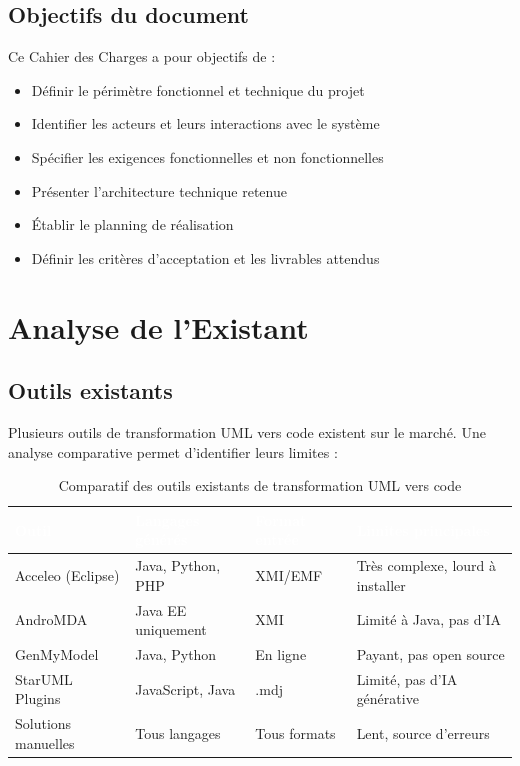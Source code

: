 \documentclass[12pt,a4paper]{article}
\begin{document}
\subsection{Objectifs du document}

Ce Cahier des Charges a pour objectifs de :
\begin{itemize}[leftmargin=1.5em]
  \item Définir le périmètre fonctionnel et technique du projet
  \item Identifier les acteurs et leurs interactions avec le système
  \item Spécifier les exigences fonctionnelles et non fonctionnelles
  \item Présenter l'architecture technique retenue
  \item Établir le planning de réalisation
  \item Définir les critères d'acceptation et les livrables attendus
\end{itemize}

\section{Analyse de l'Existant}

\subsection{Outils existants}

Plusieurs outils de transformation UML vers code existent sur le marché. Une analyse comparative permet d'identifier leurs limites :

\begin{table}[H]
\centering
\renewcommand{\arraystretch}{1.3}
\begin{tabularx}{\textwidth}{|l|l|l|X|}
\hline
\rowcolor{darkblue!90}
\textcolor{white}{\textbf{Outil}} &
\textcolor{white}{\textbf{Langages générés}} &
\textcolor{white}{\textbf{Format entrée}} &
\textcolor{white}{\textbf{Limites principales}} \\
\hline
Acceleo (Eclipse) & Java, Python, PHP & XMI/EMF & Très complexe, lourd à installer \\
\hline
\rowcolor{lightgray}
AndroMDA & Java EE uniquement & XMI & Limité à Java, pas d'IA \\
\hline
GenMyModel & Java, Python & En ligne & Payant, pas open source \\
\hline
\rowcolor{lightgray}
StarUML Plugins & JavaScript, Java & .mdj & Limité, pas d'IA générative \\
\hline
Solutions manuelles & Tous langages & Tous formats & Lent, source d'erreurs \\
\hline
\end{tabularx}
\caption{Comparatif des outils existants de transformation UML vers code}
\end{table}
\end{document}
